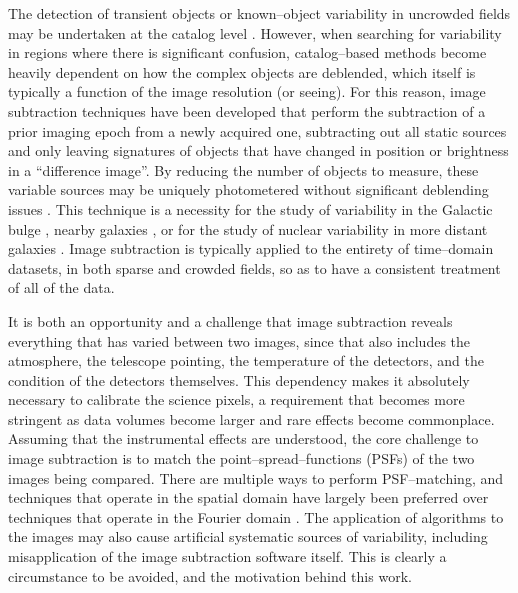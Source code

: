 \documentclass[iop]{emulateapj}
\begin{document}
The detection of transient objects or known--object variability in uncrowded fields may be undertaken at the catalog level \cite{drake}.
However, when searching for variability in regions where there is significant confusion, catalog--based methods become heavily dependent on how the complex objects are deblended, which itself is typically a function of the image resolution (or seeing).
For this reason, image subtraction techniques have been developed that perform the subtraction of a prior imaging epoch from a newly acquired one, subtracting out all static sources and only leaving signatures of objects that have changed in position or brightness in a ``difference image''.
By reducing the number of objects to measure, these variable sources may be uniquely photometered without significant deblending issues \citep[crowded--field difference images are indeed possible and present their own challenges, e.g.][]{m31}.
This technique is a necessity for the study of variability in the Galactic bulge \citep[e.g. microlensing;][]{microlensing}, nearby galaxies \citep[e.g. nearby supernovae;][]{nearby-sne}, or for the study of nuclear variability in more distant galaxies \cite[e.g.][]{yumi}.
Image subtraction is typically applied to the entirety of time--domain datasets, in both sparse and crowded fields, so as to have a consistent treatment of all of the data.

It is both an opportunity and a challenge that image subtraction reveals everything that has varied between two images, since that also includes the atmosphere, the telescope pointing, the temperature of the detectors, and the condition of the detectors themselves.
This dependency makes it absolutely necessary to calibrate the science pixels, a requirement that becomes more stringent as data volumes become larger and rare effects become commonplace.
Assuming that the instrumental effects are understood, the core challenge to image subtraction is to match the point--spread--functions (PSFs) of the two images being compared.
There are multiple ways to perform PSF--matching, and techniques that operate in the spatial domain \citep{alard-lupton,alard} have largely been preferred over techniques that operate in the Fourier domain \citep{tomaney-crotts}.
The application of algorithms to the images may also cause artificial systematic sources of variability, including misapplication of the image subtraction software itself.
This is clearly a circumstance to be avoided, and the motivation behind this work.
\end{document}
